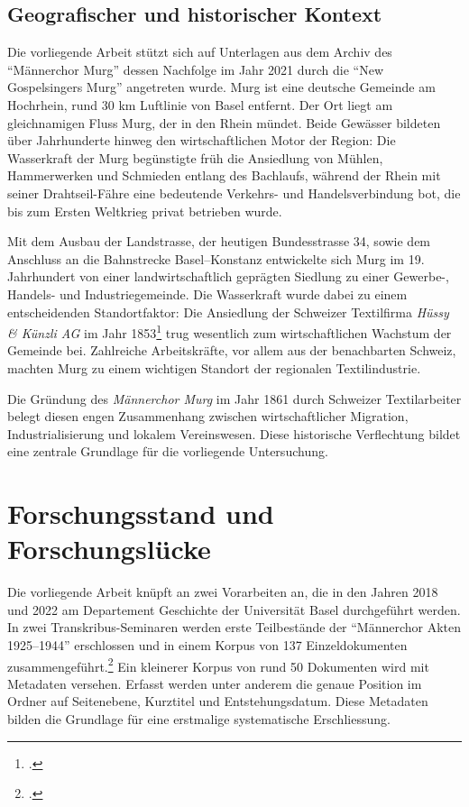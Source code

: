 \documentclass[12pt, a4paper, ngerman, bidi=default]{article}
\let\cite\footcite
\begin{document}
\subsection{Geografischer und historischer Kontext}
Die vorliegende Arbeit stützt sich auf Unterlagen aus dem Archiv des \enquote{Männerchor Murg} dessen Nachfolge im Jahr 2021 
durch die \enquote{New Gospelsingers Murg} angetreten wurde. Murg ist eine deutsche Gemeinde am Hochrhein, 
rund 30 km Luftlinie von Basel entfernt. Der Ort liegt am gleichnamigen Fluss Murg, der in den Rhein mündet. 
Beide Gewässer bildeten über Jahrhunderte hinweg den wirtschaftlichen Motor der Region: Die Wasserkraft der Murg 
begünstigte früh die Ansiedlung von Mühlen, Hammerwerken und Schmieden entlang des Bachlaufs, während der Rhein mit seiner 
Drahtseil-Fähre eine bedeutende Verkehrs- und Handelsverbindung bot, die bis zum Ersten Weltkrieg privat betrieben wurde.

Mit dem Ausbau der Landstrasse, der heutigen Bundesstrasse 34, sowie dem Anschluss an die Bahnstrecke Basel–Konstanz 
entwickelte sich Murg im 19. Jahrhundert von einer landwirtschaftlich geprägten Siedlung zu einer Gewerbe-, Handels- und 
Industriegemeinde. Die Wasserkraft wurde dabei zu einem entscheidenden Standortfaktor: Die Ansiedlung der Schweizer 
Textilfirma \textit{Hüssy \& Künzli AG} im Jahr 1853\cite[vgl.][]{gemeinde_murg_geschichte_nodate} trug wesentlich 
zum wirtschaftlichen Wachstum der Gemeinde bei. Zahlreiche Arbeitskräfte, vor allem aus der benachbarten Schweiz, 
machten Murg zu einem wichtigen Standort der regionalen Textilindustrie.

Die Gründung des \textit{Männerchor Murg} im Jahr 1861 durch Schweizer Textilarbeiter belegt diesen engen Zusammenhang 
zwischen wirtschaftlicher Migration, Industrialisierung und lokalem Vereinswesen. Diese historische Verflechtung bildet 
eine zentrale Grundlage für die vorliegende Untersuchung.


  

\newpage
\section{Forschungsstand und Forschungslücke}\label{subsec:forschungsstand}

Die vorliegende Arbeit knüpft an zwei Vorarbeiten an, die in den Jahren 2018 und 2022 am Departement Geschichte der Universität Basel durchgeführt
werden. In zwei Transkribus-Seminaren werden erste Teilbestände der \enquote{Männerchor Akten 1925--1944} erschlossen und in einem Korpus
von 137 Einzeldokumenten zusammengeführt.\cite[vgl.][]{burkhardt_feldpost_2022}
Ein kleinerer Korpus von rund 50 Dokumenten wird mit Metadaten versehen. Erfasst werden unter anderem die genaue Position im Ordner auf Seitenebene, 
Kurztitel und Entstehungsdatum. Diese Metadaten bilden die Grundlage für eine erstmalige systematische Erschliessung.
\end{document}
